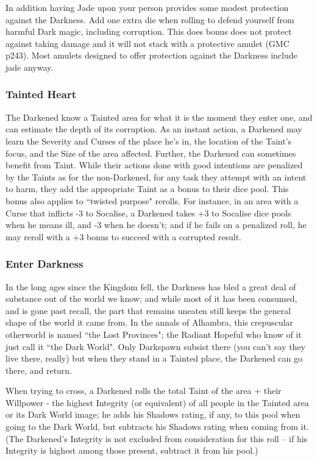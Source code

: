 In addition having Jade upon your person provides some modest protection against the Darkness. Add one extra die when rolling to defend yourself from harmful Dark magic, including corruption. This does bonus does not protect against taking damage and it will not stack with a protective amulet (GMC p243). Most amulets designed to offer protection against the Darkness include jade anyway. 
\subsubsection*{Tainted Heart}
The Darkened know a Tainted area for what it is the moment they enter one, and can estimate the depth of its corruption. As an instant action, a Darkened may learn the Severity and Curses of the place he's in, the location of the Taint's focus, and the Size of the area affected. Further, the Darkened can sometimes benefit from Taint. While their actions done with good intentions are penalized by the Taints as for the non-Darkened, for any task they attempt with an intent to harm, they add the appropriate Taint as a bonus to their dice pool. This bonus also applies to \textquotedblleft twisted purpose" rerolls. For instance, in an area with a Curse that inflicts -3 to Socalise, a Darkened takes +3 to Socalise dice pools when he means ill, and -3 when he doesn't; and if he fails on a penalized roll, he may reroll with a +3 bonus to succeed with a corrupted result. 
\subsubsection*{Enter Darkness}
In the long ages since the Kingdom fell, the Darkness has bled a great deal of substance out of the world we know; and while most of it has been consumed, and is gone past recall, the part that remains uneaten still keeps the general shape of the world it came from. In the annals of Alhambra, this crepuscular otherworld is named \textquotedblleft the Lost Provinces"; the Radiant Hopeful who know of it just call it \textquotedblleft the Dark World". Only Darkspawn subsist there (you can't say they live there, really) but when they stand in a Tainted place, the Darkened can go there, and return.

When trying to cross, a Darkened rolls the total Taint of the area + their Willpower - the highest Integrity (or equivalent) of all people in the Tainted area or its Dark World image; he adds his Shadows rating, if any, to this pool when going to the Dark World, but subtracts his Shadows rating when coming from it. (The Darkened's Integrity is not excluded from consideration for this roll -- if his Integrity is highest among those present, subtract it from his pool.) 

